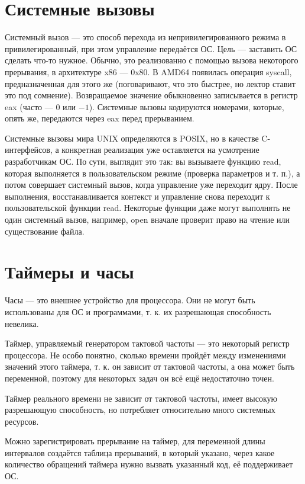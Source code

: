 \documentclass[main]{subfiles}
\begin{document}
\section{Системные вызовы}
Системный вызов --- это способ перехода из непривилегированного режима в
привилегированный, при этом управление передаётся ОС. Цель --- заставить ОС
сделать что-то нужное. Обычно, это реализованно с помощью вызова некоторого
прерывания, в архитектуре x86 --- 0x80. В AMD64 появилась операция syscall, предназначенная
для этого же (поговаривают, что это быстрее, но лектор ставит это под сомнение).
Возвращаемое значение обыкновенно записывается в регистр eax (часто --- $0$ или $-1$).
Системные вызовы кодируются номерами, которые, опять же, передаются через eax
перед прерыванием.

Системные вызовы мира UNIX определяются в POSIX, но в качестве C-интерфейсов, а
конкретная реализация уже оставляется на усмотрение разработчикам ОС.
По сути, выглядит это так: вы вызываете функцию read, которая выполняется
в пользовательском режиме (проверка параметров и т. п.), а потом совершает
системный вызов, когда управление уже переходит ядру. После выполнения,
восстанавливается контекст и управление снова переходит к пользовательской
функции read. Некоторые функции даже могут выполнять не один системный вызов,
например, open вначале проверит право на чтение или существование файла.

\section{Таймеры и часы}
Часы --- это внешнее устройство для процессора. Они не могут быть использованы
для ОС и программами, т. к. их разрешающая способность невелика.

Таймер, управляемый генератором тактовой частоты --- это некоторый регистр
процессора. Не особо понятно, сколько времени пройдёт между изменениями
значений этого таймера, т. к. он зависит от тактовой частоты, а она может
быть переменной, поэтому для некоторых задач он всё ещё недостаточно
точен.

Таймер реального времени не зависит от тактовой частоты, имеет высокую
разрешающую способность, но потребляет относительно много системных ресурсов.

Можно зарегистрировать прерывание на таймер, для переменной длины интервалов
создаётся таблица прерываний, в который указано, через какое количество
обращений таймера нужно вызвать указанный код, её поддерживает ОС.
\end{document}
